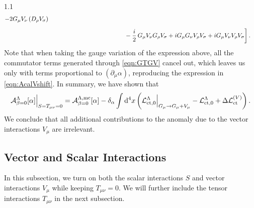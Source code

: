 \documentclass[a4paper,12pt]{article}
\def\L{{\cal L}}
\def\Acal{{\cal A}}
\begin{document}
\begin{spacing}{1.1}
\begin{align}
- 2 G_\mu V_\nu \left(D_\rho V_\sigma\right)
\notag\\[5pt]
&\hspace{123pt}
- \frac{i}{2}\, G_\mu V_\nu G_\rho V_\sigma + i G_\mu G_\nu V_\rho V_\sigma
+ i G_\mu V_\nu V_\rho V_\sigma
\bigg] \,.
\label{eq:LctV}
\end{align}
Note that when taking the gauge variation of the expression above, all the commutator terms generated through \cref{eqn:GTGV} cancel out, which leaves us only with terms proportional to $(\partial_\mu \alpha)$, reproducing the expression in \cref{eqn:AcalVshift}. In summary, we have shown that
\begin{equation}
\Acal_{\beta=0}^\Lambda [\alpha]\Bigr|_{S=T_{\mu\nu}=0} = \Acal_{\beta=0}^{\Lambda,\text{mc}}[\alpha] - \delta_\alpha \int \dd^4x \left( \L_{\text{ct},0}^\Lambda\Bigr|_{G_\mu\to G_\mu+V_\mu} - \L_{\text{ct},0}^\Lambda + \Delta\L_{\text{ct}}^{(V)} \right) .
\end{equation}
We conclude that all additional contributions to the anomaly due to the vector interactions $V_\mu$ are irrelevant.


\subsection{Vector and Scalar Interactions}
\label{subsec:Scalar}

In this subsection, we turn on both the scalar interactions $S$ and vector interactions $V_\mu$ while keeping $T_{\mu\nu}=0$. We will further include the tensor interactions $T_{\mu\nu}$ in the next subsection.


\end{spacing}
\end{document}
